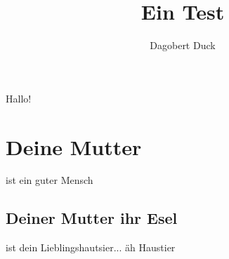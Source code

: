 \documentclass{\basedir/fablab-document}
\title{Ein Test}
\author{Dagobert Duck}
\begin{document}
\maketitle

Hallo!

\tableofcontents %
 
\section{Deine Mutter}
ist ein guter Mensch
\subsection{Deiner Mutter ihr Esel}
ist dein Lieblingshautsier... äh Haustier

 \blindtext[20]
 
 
\end{document}

